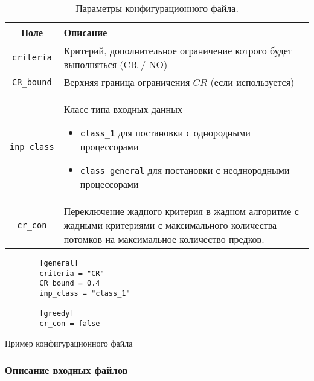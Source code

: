 \begin{table}[!htbp]
    \centering
    \begin{tabularx}{\textwidth}{|c|X|}
        \hline
        Поле                & Описание                                                                                                                                      \\
        \hline
        \texttt{criteria}   & Критерий, дополнительное ограничение котрого будет выполняться (CR / NO)                                                                      \\
        \hline
        \texttt{CR\_bound}  & Верхняя граница ограничения $CR$ (если используется)                                                                                          \\
        \hline
        \texttt{inp\_class} & Класс типа входных данных
        \begin{itemize}
            \item \texttt{class\_1} для постановки с однородными процессорами
            \item \texttt{class\_general} для постановки с неоднородными процессорами
        \end{itemize}                                                                                            \\
        \hline
        \texttt{cr\_con}    & Переключение жадного критерия в жадном алгоритме с жадными критериями с максимального количества потомков на максимальное количество предков. \\
        \hline
    \end{tabularx}
    \caption{Параметры конфигурационного файла.}
    \label{tbl:config-file-parameters}
\end{table}
\begin{listing}
    \begin{verbatim}
        [general] 
        criteria = "CR" 
        CR_bound = 0.4 
        inp_class = "class_1" 
        
        [greedy] 
        cr_con = false
    \end{verbatim}
    \caption{Пример конфигурационного файла}
    \label{lst:config-file}
\end{listing}

\subsubsection{Описание входных файлов}

